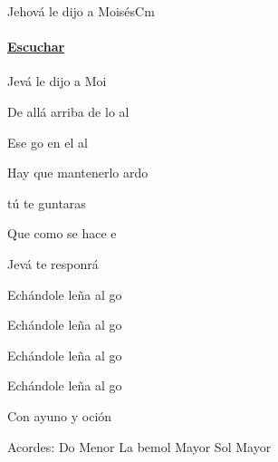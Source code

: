 \documentclass[12pt, spanish]{book}
\begin{document}
    \begin{song}{Jehová le dijo a Moisés}{Cm}
    {} %
    {}
    {} %
    {}
        \ifChordBk
        \paragraph{\mbox{}\hfill\protect\href{https://open.spotify.com/intl-es/track/40WZ8YA7FTOpsR3iQsEOiE}{Escuchar}\mbox{}\hfill}
        \fi


        \begin{SBOpGroup}
            Jevá le dijo a Moi

            De allá arriba de lo al

            Ese go en el al

            Hay que mantenerlo ardo
        \end{SBOpGroup}

        \begin{SBOpGroup}
             tú te guntaras

            Que como se hace e

            Jevá te responrá

            Echándole leña al go
        \end{SBOpGroup}

        \begin{SBChorus}
            Echándole leña al go

            Echándole leña al go

            Echándole leña al go

            Con ayuno y oción
        \end{SBChorus}

        \ifChordBk
        \begin{SBOpGroup}
            Acordes:
            \upchord{\Cm}\qquad Do Menor \hfill
            \upchord{\Aflat}\qquad La bemol Mayor \hfill\null\break
            \upchord{\G}\qquad Sol Mayor \hfill\null\break
        \end{SBOpGroup}
        \fi
    \end{song}
\end{document}
